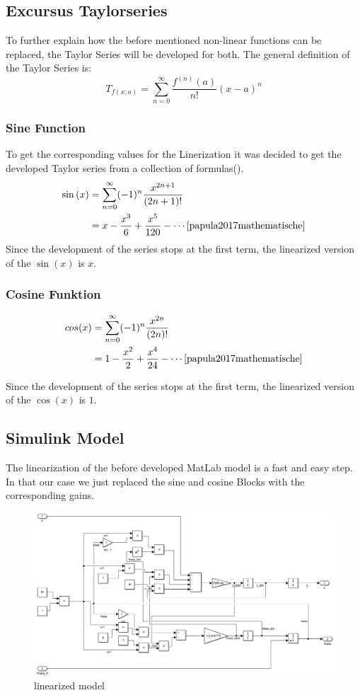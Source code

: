 \subsection{Excursus Taylorseries}
To further explain how the before mentioned non-linear functions can be replaced, the Taylor Series will be developed for both. The general definition of the Taylor Series is:
\begin{equation}
      T_{f(x;a)} = \sum^\infty_{n=0} \frac{f^{(n)}(a)}{n!}(x-a)^n
    \label{eq:Taylor_Series}  
\end{equation}
\subsubsection{Sine Function}
To get the corresponding values for the Linerization it was decided to get the developed Taylor series from a collection of formulas(\cite{papula2017mathematische}).
\begin{align}
    \sin \,(x)&=\sum _{n=0}^{\infty }(-1)^{n}{\frac {x^{2n+1}}{(2n+1)!}} \\
    &=x-{\frac {x^{3}}{6}}+{\frac {x^{5}}{120}}-\cdots \cite[p. 187]{papula2017mathematische}
\end{align}
Since the development of the series stops at the first term, the linearized version of the $\sin(x)$ is $x$.
\subsubsection{Cosine Funktion}
\begin{align}
    cos(x)&=\sum _{n=0}^{\infty }(-1)^{n}{\frac {x^{2n}}{(2n)!}}\\
    &=1-{\frac {x^{2}}{2}}+{\frac {x^{4}}{24}}-\cdots  \cite[p. 187]{papula2017mathematische}
\end{align}

Since the development of the series stops at the first term, the linearized version of the $\cos(x)$ is $1$.
\newpage
\subsection{Simulink Model}
The linearization of the before developed MatLab model is a fast and easy step. In that our case we just replaced the sine and cosine Blocks with the corresponding gains. 
\begin{figure}[H]
    \centering
    \includegraphics[width=\textwidth]{Lab_report/pics/modelBuilding/linearized_model.PNG}
    \caption{linearized model}
    \label{fig:lin_model}
\end{figure}

